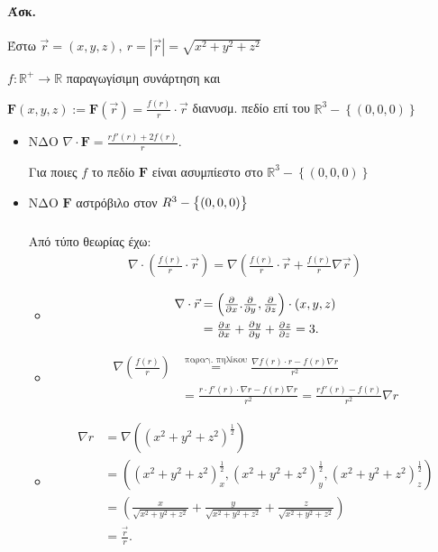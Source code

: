 \documentclass[11pt,a4paper,titlepage,draft]{article}
\begin{document}
\paragraph{Άσκ.}
Έστω \(\vec r = (x,y,z),\ r = |\vec r|=\sqrt{x^2+y^2+z^2}\)

\( f:\mathbb R ^+ \to \mathbb R  \) παραγωγίσιμη συνάρτηση και

\( \mathbf F(x,y,z) := \mathbf F(\vec r) = \frac{f(r)}{r} \cdot \vec r \)
διανυσμ. πεδίο επί του \( \mathbb R ^3 - \left\lbrace (0,0,0) \right\rbrace \)

\begin{itemize}
\item ΝΔΟ \(
\nabla \cdot \mathbf F = \frac{rf'(r)+2f(r)}{r}
\).

Για ποιες \(f\) το πεδίο \( \mathbf F \) είναι ασυμπίεστο στο \( \mathbb R ^3-\left\lbrace (0,0,0) \right\rbrace \)

\item ΝΔΟ \( \mathbf F \) αστρόβιλο στον \( \mathbf \mathbb R ^3 - \left\lbrace (0,0,0) \right\rbrace \)

\subparagraph{}
Από τύπο θεωρίας έχω:
\begin{align}
\nabla \cdot \left(
\frac{f(r)}{r}\cdot \vec r
\right) = \nabla \left(
\frac{f(r)}{r} \cdot \vec r + \frac{f(r)}{r} \nabla \vec r
\right)
\end{align}

\begin{itemize}
\item \begin{align*}
\nabla \cdot \vec r &= \left(\pd{}{x}.\pd{}{y},\pd{}{z} \right) \cdot (x,y,z) \\
&= \pd{x}{x} + \pd{y}{y} + \pd{z}{z} = 3.
\end{align*}

\item \begin{align*}
\nabla \left(
\frac{f(r)}{r}\right) &\overset{\text{παραγ. πηλίκου}}{=} \frac{\nabla f(r) \cdot r - f(r) \nabla r}{r^2} \\
&= \frac{r \cdot f'(r) \cdot \nabla r - f(r) \nabla r }{r^2} = \frac{rf'(r)-f(r)}{r^2}\nabla r
\end{align*}

\item \begin{align*}
\nabla r &= \nabla \left(
(x^2+y^2+z^2)^\frac{1}{2}
\right) \\ &= \left(
(x^2+y^2+z^2)_x^\frac{1}{2},(x^2+y^2+z^2)_y^\frac{1}{2},(x^2+y^2+z^2)_z^\frac{1}{2}
\right) \\
&= \left(
\frac{x}{\sqrt{x^2+y^2+z^2}}+\frac{y}{\sqrt{x^2+y^2+z^2}}+\frac{z}{\sqrt{x^2+y^2+z^2}}
\right) \\ &=
\frac{\vec r}{r}.
\end{align*}


\end{itemize}
\end{itemize}
\end{document}
